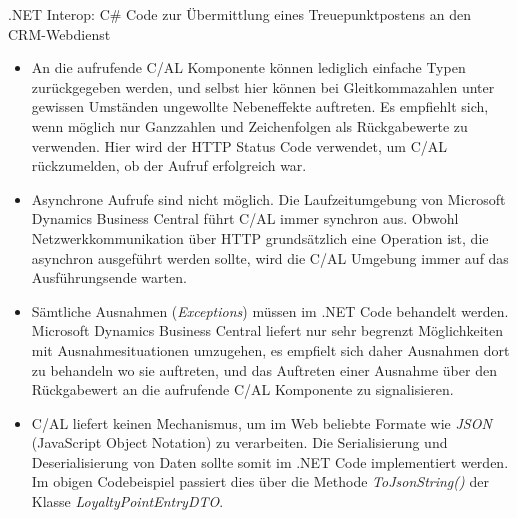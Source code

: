 \begin{program}  %
	\centering
	\caption{.NET Interop: C\# Code zur Übermittlung eines Treuepunktpostens an den CRM-Webdienst}
	\label{prog:.netWS}

	\begin{JavaCode}
public class WebRequestHandler
{
  private int TransmitEntry(LoyaltyPointEntryDTO dto, string endpoint)
  {
    try
    {
    	HttpClient client = new HttpClient();
    	client.BaseAddress = new Uri(endpoint);
    	client.DefaultRequestHeaders.Accept.Add(new MediaTypeWithQualityHeaderValue("application/json"));
    	HttpContent content = new StringContent(dto.ToJsonString(), Encoding.UTF8, "application/json");
    	
    	HttpResponseMessage response = client.PostAsync(endpoint, content).Result;
    	return (int)response.StatusCode;
    }
    catch (Exception e)
    {
    	return 0;
    }
  }
	\end{JavaCode}
\end{program}

\begin{itemize}
	\item An die aufrufende C/AL Komponente können lediglich einfache Typen zurückgegeben werden, und selbst hier können bei Gleitkommazahlen unter gewissen Umständen ungewollte Nebeneffekte auftreten. Es empfiehlt sich, wenn möglich nur Ganzzahlen und Zeichenfolgen als Rückgabewerte zu verwenden. Hier wird der HTTP Status Code verwendet, um C/AL rückzumelden, ob der Aufruf erfolgreich war.
	\item Asynchrone Aufrufe sind nicht möglich. Die Laufzeitumgebung von Microsoft Dynamics Business Central führt C/AL immer synchron aus. Obwohl Netzwerkkommunikation über HTTP grundsätzlich eine Operation ist, die asynchron ausgeführt werden sollte, wird die C/AL Umgebung immer auf das Ausführungsende warten.
	\item Sämtliche Ausnahmen (\textit{Exceptions}) müssen im .NET Code behandelt werden. Microsoft Dynamics Business Central liefert nur sehr begrenzt Möglichkeiten mit Ausnahmesituationen umzugehen, es empfielt sich daher Ausnahmen dort zu behandeln wo sie auftreten, und das Auftreten einer Ausnahme über den Rückgabewert an die aufrufende C/AL Komponente zu signalisieren.
	\item C/AL liefert keinen Mechanismus, um im Web beliebte Formate wie \textit{JSON} (JavaScript Object Notation) zu verarbeiten. Die Serialisierung und Deserialisierung von Daten sollte somit im .NET Code implementiert werden. Im obigen Codebeispiel passiert dies über die Methode \textit{ToJsonString()} der Klasse \textit{LoyaltyPointEntryDTO}. 
\end{itemize}
